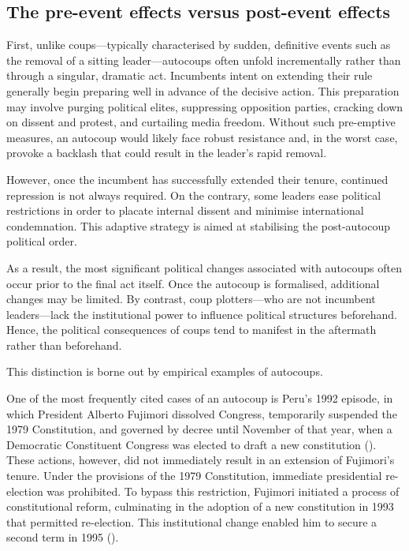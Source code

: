 \documentclass[
  12pt,
]{report}
\begin{document}
\subsection*{The pre-event effects versus post-event
effects}\label{the-pre-event-effects-versus-post-event-effects}

First, unlike coups---typically characterised by sudden, definitive
events such as the removal of a sitting leader---autocoups often unfold
incrementally rather than through a singular, dramatic act. Incumbents
intent on extending their rule generally begin preparing well in advance
of the decisive action. This preparation may involve purging political
elites, suppressing opposition parties, cracking down on dissent and
protest, and curtailing media freedom. Without such pre-emptive
measures, an autocoup would likely face robust resistance and, in the
worst case, provoke a backlash that could result in the leader's rapid
removal.

However, once the incumbent has successfully extended their tenure,
continued repression is not always required. On the contrary, some
leaders ease political restrictions in order to placate internal dissent
and minimise international condemnation. This adaptive strategy is aimed
at stabilising the post-autocoup political order.

As a result, the most significant political changes associated with
autocoups often occur prior to the final act itself. Once the autocoup
is formalised, additional changes may be limited. By contrast, coup
plotters---who are not incumbent leaders---lack the institutional power
to influence political structures beforehand. Hence, the political
consequences of coups tend to manifest in the aftermath rather than
beforehand.

This distinction is borne out by empirical examples of autocoups.

One of the most frequently cited cases of an autocoup is Peru's 1992
episode, in which President Alberto Fujimori dissolved Congress,
temporarily suspended the 1979 Constitution, and governed by decree
until November of that year, when a Democratic Constituent Congress was
elected to draft a new constitution (). These actions, however, did not immediately result
in an extension of Fujimori's tenure. Under the provisions of the 1979
Constitution, immediate presidential re-election was prohibited. To
bypass this restriction, Fujimori initiated a process of constitutional
reform, culminating in the adoption of a new constitution in 1993 that
permitted re-election. This institutional change enabled him to secure a
second term in 1995 ().
\end{document}
